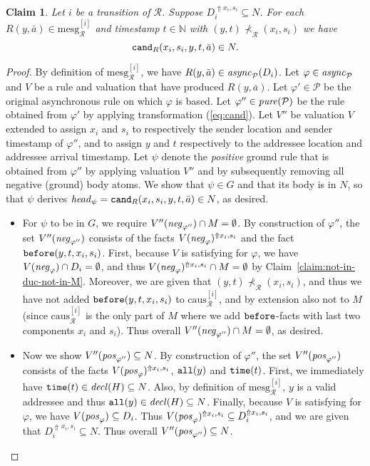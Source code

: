 \documentclass{tlp}
\newtheorem{claim}[theorem]{Claim}
\newcommand{\Nat}{\mathbb{N}}  \newcommand{\len}[1]{|#1|} \newcommand{\rom}[1]{\text{\emph{(#1)}}} \newcommand{\romI}{\rom i}
\newcommand{\ded}{\mathcal{P}}
\newcommand{\rl}{\varphi}
\newcommand{\head}[1]{\fname{head}_{#1}}
\newcommand{\bpos}[1]{\fname{pos}_{#1}}
\newcommand{\bneg}[1]{\fname{neg}_{#1}}
\newcommand{\grl}{\psi}
\newcommand{\addlt}[3]{#1^{\Uparrow#2,#3}}
\newcommand{\reltime}{\pred{time}}
\newcommand{\relall}{\pred{all}}
\newcommand{\before}{\pred{before}}
\newcommand{\cand}{\pred{cand}}
\newcommand{\decl}[1]{\fname{decl}(#1)}
\newcommand{\pure}[1]{\fname{pure}(#1)}
\newcommand{\run}{\mathcal{R}}
\newcommand{\async}[1]{\fname{async}_{#1}}
\newcommand{\mstep}[1]{(#1)}
\newcommand{\slicecaus}[1]{\text{caus}_{\run}^{[#1]}}
\newcommand{\mesg}[1]{\mathrm{mesg}_{\run}^{[#1]}}
\newcommand{\caus}{\prec_{\run}}
\newcommand{\grded}{G}
\begin{document}
\begin{appendix}
\tline



\begin{claim}\label{claim:cand-in-stable}Let $i$ be a transition
of $\run$. Suppose $\addlt{D_{i}}{x_{i}}{s_{i}}\subseteq N$. For
each $R(y,\bar{a})\in\mesg i$ and timestamp $t\in\Nat$ with $(y,t)\not\caus(x_{i},s_{i})$
we have 
\[
\cand_{R}(x_{i},s_{i},y,t,\bar{a})\in N.
\]
\end{claim}

\begin{proof}

By definition of $\mesg i$, we have $R(y,\bar{a})\in\async{\ded}\mstep{D_{i}}$.
Let $\rl\in\async{\ded}$ and $V$ be a rule and valuation that have
produced $R(y,\bar{a})$. Let $\rl'\in\ded$ be the original asynchronous
rule on which $\rl$ is based. Let $\rl''\in\pure{\ded}$ be the rule
obtained from $\rl'$ by applying transformation (\ref{eq:cand}).
Let $V''$ be valuation $V$ extended to assign $x_{i}$ and $s_{i}$
to respectively the sender location and sender timestamp of $\rl''$,
and to assign $y$ and $t$ respectively to the addressee location
and addressee arrival timestamp. Let $\grl$ denote the \emph{positive}
ground rule that is obtained from $\rl''$ by applying valuation $V''$
and by subsequently removing all negative (ground) body atoms. We
show that $\grl\in\grded$ and that its body is in $N$, so that $\grl$
derives $\head{\grl}=\cand_{R}(x_{i},s_{i},y,t,\bar{a})\in N$, as
desired.
\begin{itemize}
\item For $\grl$ to be in $\grded$, we require $V''(\bneg{\rl''})\cap M=\emptyset$.
By construction of $\rl''$, the set $V''(\bneg{\rl''})$ consists
of the facts $\addlt{V(\bneg{\rl})}{x_{i}}{s_{i}}$ and the fact $\before(y,t,x_{i},s_{i})$.
First, because $V$ is satisfying for $\rl$, we have $V(\bneg{\rl})\cap D_{i}=\emptyset$,
and thus $\addlt{V(\bneg{\rl})}{x_{i}}{s_{i}}\cap M=\emptyset$ by
Claim~\ref{claim:not-in-duc-not-in-M}. Moreover, we are given that
$(y,t)\not\caus(x_{i},s_{i})$, and thus we have not added $\before(y,t,x_{i},s_{i})$
to $\slicecaus i$, and by extension also not to $M$ (since $\slicecaus i$
is the only part of $M$ where we add $\before$-facts with last two
components $x_{i}$ and $s_{i}$). Thus overall $V''(\bneg{\rl''})\cap M=\emptyset$,
as desired.
\item Now we show $V''(\bpos{\rl''})\subseteq N$. By construction of $\rl''$,
the set $V''(\bpos{\rl''})$ consists of the facts $\addlt{V(\bpos{\rl})}{x_{i}}{s_{i}}$,
$\relall(y)$ and $\reltime(t)$. First, we immediately have $\reltime(t)\in\decl H\subseteq N$.
Also, by definition of $\mesg i$, $y$ is a valid addressee and thus
$\relall(y)\in\decl H\subseteq N$. Finally, because $V$ is satisfying
for $\rl$, we have $V(\bpos{\rl})\subseteq D_{i}$. Thus $\addlt{V(\bpos{\rl})}{x_{i}}{s_{i}}\subseteq\addlt{D_{i}}{x_{i}}{s_{i}}$,
and we are given that $\addlt{D_{i}}{x_{i}}{s_{i}}\subseteq N$. Thus
overall $V''(\bpos{\rl''})\subseteq N$.
\end{itemize}
\end{proof}



\end{appendix}
\end{document}
